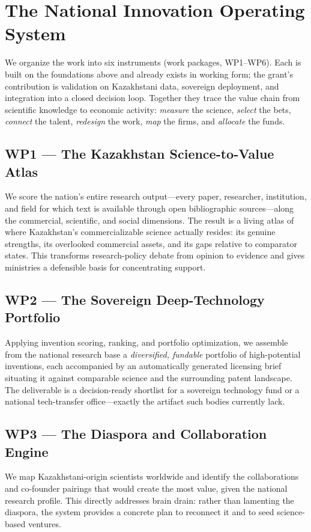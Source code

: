 \documentclass[11pt]{article}
\begin{document}
\section{The National Innovation Operating System}

We organize the work into six instruments (work packages, WP1--WP6). Each is
built on the foundations above and already exists in working form; the grant's
contribution is validation on Kazakhstani data, sovereign deployment, and
integration into a closed decision loop. Together they trace the value chain from
scientific knowledge to economic activity: \emph{measure} the science,
\emph{select} the bets, \emph{connect} the talent, \emph{redesign} the work,
\emph{map} the firms, and \emph{allocate} the funds.

\subsection*{WP1 --- The Kazakhstan Science-to-Value Atlas}
We score the nation's entire research output---every paper, researcher,
institution, and field for which text is available through open bibliographic
sources---along the commercial, scientific, and social dimensions. The result is
a living atlas of where Kazakhstan's commercializable science actually resides:
its genuine strengths, its overlooked commercial assets, and its gaps relative to
comparator states. This transforms research-policy debate from opinion to
evidence and gives ministries a defensible basis for concentrating support.

\subsection*{WP2 --- The Sovereign Deep-Technology Portfolio}
Applying invention scoring, ranking, and portfolio optimization, we assemble
from the national research base a \emph{diversified, fundable} portfolio of
high-potential inventions, each accompanied by an automatically generated
licensing brief situating it against comparable science and the surrounding
patent landscape. The deliverable is a decision-ready shortlist for a sovereign
technology fund or a national tech-transfer office---exactly the artifact such
bodies currently lack.

\subsection*{WP3 --- The Diaspora and Collaboration Engine}
We map Kazakhstani-origin scientists worldwide and identify the collaborations
and co-founder pairings that would create the most value, given the national
research profile. This directly addresses brain drain: rather than lamenting the
diaspora, the system provides a concrete plan to reconnect it and to seed
science-based ventures.
\end{document}
